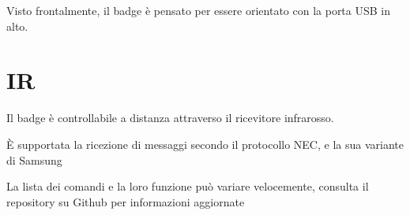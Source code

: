 \documentclass[10pt]{datasheet}
\newcommand*\circled[1]{\tikz[baseline=(char.base)]{
		\node[shape=circle,draw,inner sep=2pt, fill=white] (char) {#1};}}
\begin{document}
	\begin{center}

	\end{center}
		Visto frontalmente, il badge è pensato per essere orientato con la porta USB in alto. 
		
		\section{IR}
		Il badge è controllabile a distanza attraverso il ricevitore infrarosso.
		
		È supportata la ricezione di messaggi secondo il protocollo NEC, e la sua variante di Samsung
		
		La lista dei comandi e la loro funzione può variare velocemente, consulta il repository su Github per informazioni aggiornate
	
\end{document}
